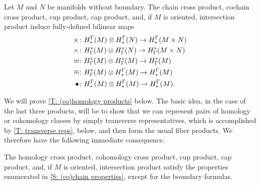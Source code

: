 \begin{theorem}\label{T: (co)homology products}
	Let $M$ and $N$ be manifolds without boundary.
	The chain cross product, cochain cross product, cup product, cap product, and, if $M$ is oriented, intersection product induce fully-defined bilinear maps
	\begin{align*}
		\times \colon & H^\Gamma_*(M) \otimes H^\Gamma_*(N) \to H^\Gamma_*(M \times N)\\
		\times \colon & H_\Gamma^*(M) \otimes H_\Gamma^*(N) \to H_\Gamma^*(M \times N)\\
		\uplus \colon & H_\Gamma^*(M) \otimes H_\Gamma^*(M) \to H_\Gamma^*(M)\\
		\nplus \colon & H_\Gamma^*(M) \otimes H^\Gamma_*(M) \to H^\Gamma_*(M)\\
		\bullet \colon & H^\Gamma_*(M) \otimes H^\Gamma_*(M) \to H^\Gamma_*(M).\\
	\end{align*}
\end{theorem}

We will prove \cref{T: (co)homology products} below.
The basic idea, in the case of the last three products, will be to show that we can represent pairs of homology or cohomology classes by simply transverse representatives, which is accomplished by \cref{T: transverse reps}, below, and then form the usual fiber products.
We therefore have the following immediate consequence.

\begin{theorem}\label{T: coho product properties}
	The homology cross product, cohomology cross product, cup product, cap product, and, if $M$ is oriented, intersection product satisfy the properties enumerated in \cref{S: (co)chain properties}, except for the boundary formulas.
\end{theorem}

